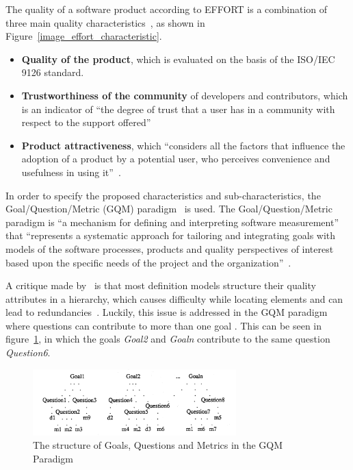 The quality of a
software product according to EFFORT is a combination of three main
quality characteristics~\cite{effort}, as shown in Figure~\ref{image_effort_characteristic}.

\begin{itemize}
\tightlist
\item
  \textbf{Quality of the product}, which is evaluated on the basis of
  the ISO/IEC 9126 standard.
\item
  \textbf{Trustworthiness of the community} of developers and
  contributors, which is an indicator of ``the degree of trust that a
  user has in a community with respect to the
  support offered''~\cite{effort}
\item
  \textbf{Product attractiveness}, which ``considers all the factors that
  influence the adoption of a product by a potential user, who perceives
  convenience and usefulness in using it''~\cite{effort}.
\end{itemize}


In order to specify the proposed characteristics and
sub-characteristics, the Goal/Question/Metric (GQM) paradigm~\cite{gqm} is used.
The Goal/Question/Metric paradigm is ``a mechanism for defining
and interpreting software measurement'' that ``represents a systematic approach for
tailoring and integrating goals with models of the software processes,
products and quality perspectives of interest based upon the specific
needs of the project and the organization''~\cite{gqm}.

A critique made by~\cite{dap_model} is that most definition models
structure their quality attributes in a
hierarchy, which causes difficulty while locating elements and can lead
to redundancies~\cite{dap_model}. Luckily, this issue is addressed in the GQM
paradigm where questions can contribute to more than one goal \cite{gqm}. This can
be seen in figure~\ref{image_qgm_tree}, in which the goals
\emph{Goal2} and \emph{Goaln} contribute to the same question
\emph{Question6}.

\begin{figure}[h!]
\centering
\includegraphics[width=0.7\textwidth]{images/Untitled_19.png}
    \caption{The structure of Goals, Questions and Metrics in the GQM Paradigm~\cite{gqm}}
    \label{image_qgm_tree}
\end{figure}

